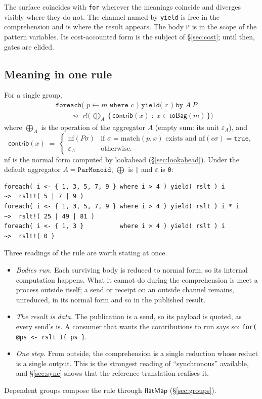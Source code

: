 \documentclass[11pt]{article}
\theoremstyle{branddef}
\theoremstyle{brandplain}
\theoremstyle{brandrem}
\newcommand{\bind}{\mathsf{flatMap}}
\newcommand{\red}{\rightsquigarrow}
\newcommand{\nf}{\mathrm{nf}}
\newcommand{\match}{\mathrm{match}}
\begin{document}
The surface coincides with \texttt{for} wherever the meanings coincide and
diverges visibly where they do not. The channel named by \texttt{yield} is free
in the comprehension and is where the result appears. The body \texttt{P} is in
the scope of the pattern variables. Its cost-accounted form is the subject of
\S\ref{sec:cost}; until then, gates are elided.

\subsection{Meaning in one rule}
\label{sec:rule}

For a single group,
\begin{align*}
&\texttt{foreach( }p \leftarrow m\texttt{ where }c\texttt{ ) yield( }r\texttt{ ) by }A\ P\\
&\qquad\red\;
r!\Big(\,\textstyle\bigoplus_{A}\ \big\{\, \mathsf{contrib}(x) \;:\; x \in \mathsf{toBag}(m) \,\big\}\Big)
\end{align*}
where \(\bigoplus_A\) is the operation of the aggregator \(A\) (empty sum: its
unit \(\varepsilon_A\)), and
\[
\mathsf{contrib}(x) \;=\;
\begin{cases}
\nf(P\sigma) & \text{if } \sigma = \match(p, x) \text{ exists and } \nf(c\sigma) = \texttt{true},\\
\varepsilon_A & \text{otherwise.}
\end{cases}
\]
\(\nf\) is the normal form computed by lookahead (\S\ref{sec:lookahead}). Under
the default aggregator \(A = \texttt{ParMonoid}\), \(\bigoplus\) is \texttt{|}
and \(\varepsilon\) is \texttt{0}:
\begin{lstlisting}
foreach( i <- { 1, 3, 5, 7, 9 } where i > 4 ) yield( rslt ) i         ~>  rslt!( 5 | 7 | 9 )
foreach( i <- { 1, 3, 5, 7, 9 } where i > 4 ) yield( rslt ) i * i     ~>  rslt!( 25 | 49 | 81 )
foreach( i <- { 1, 3 }          where i > 4 ) yield( rslt ) i         ~>  rslt!( 0 )
\end{lstlisting}
Three readings of the rule are worth stating at once.
\begin{itemize}[nosep]
\item \emph{Bodies run.} Each surviving body is reduced to normal form, so its
internal computation happens. What it cannot do during the comprehension is
meet a process outside itself; a send or receipt on an outside channel remains,
unreduced, in its normal form and so in the published result.
\item \emph{The result is data.} The publication is a send, so its payload is
quoted, as every send's is. A consumer that wants the contributions to run says
so: \verb|for( @ps <- rslt ){ ps }|.
\item \emph{One step.} From outside, the comprehension is a single reduction
whose reduct is a single output. This is the strongest reading of
``synchronous'' available, and \S\ref{sec:sync} shows that the reference
translation realises it.
\end{itemize}
Dependent groups compose the rule through \(\bind\) (\S\ref{sec:groups}).
\end{document}
